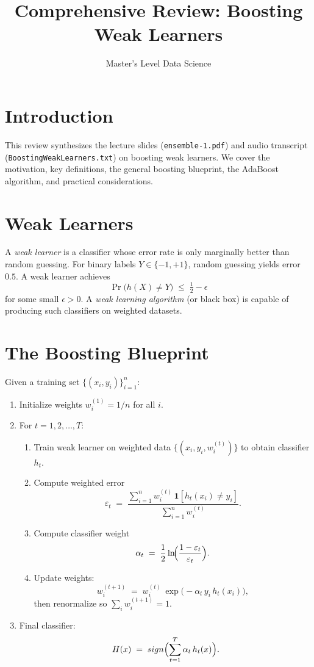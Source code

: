 \documentclass[11pt]{article}
\title{Comprehensive Review: Boosting Weak Learners}
\author{Master's Level Data Science}
\date{}
\begin{document}
\maketitle
\tableofcontents
\bigskip

\section{Introduction}
This review synthesizes the lecture slides (\texttt{ensemble-1.pdf}) and audio transcript (\texttt{BoostingWeakLearners.txt}) on boosting weak learners. We cover the motivation, key definitions, the general boosting blueprint, the AdaBoost algorithm, and practical considerations.

\section{Weak Learners}
A \emph{weak learner} is a classifier whose error rate is only marginally better than random guessing. For binary labels $Y\in\{-1,+1\}$, random guessing yields error $0.5$. A weak learner achieves
\[
  \Pr\bigl(h(X)\neq Y\bigr)\;\le\;\tfrac12 - \epsilon
\]
for some small $\epsilon>0$. A \emph{weak learning algorithm} (or black box) is capable of producing such classifiers on weighted datasets.

\section{The Boosting Blueprint}
Given a training set $\{(x_i,y_i)\}_{i=1}^n$:
\begin{enumerate}
  \item Initialize weights $w_i^{(1)} = 1/n$ for all $i$.
  \item For $t=1,2,\dots,T$:
    \begin{enumerate}
      \item Train weak learner on weighted data $\{(x_i,y_i,w_i^{(t)})\}$ to obtain classifier $h_t$.
      \item Compute weighted error
      \[
        \varepsilon_t \;=\; \frac{\sum_{i=1}^n w_i^{(t)}\,\mathbf{1}[h_t(x_i)\neq y_i]}
        {\sum_{i=1}^n w_i^{(t)}}.
      \]
      \item Compute classifier weight
      \[
        \alpha_t \;=\; \frac12 \ln\!\Bigl(\frac{1-\varepsilon_t}{\varepsilon_t}\Bigr).
      \]
      \item Update weights:
      \[
        w_i^{(t+1)} \;=\; w_i^{(t)} \,\exp\bigl(-\alpha_t\,y_i\,h_t(x_i)\bigr),
      \]
      then renormalize so $\sum_i w_i^{(t+1)}=1$.
    \end{enumerate}
  \item Final classifier:
  \[
    H(x) \;=\; sign\Bigl(\sum_{t=1}^T \alpha_t\,h_t(x)\Bigr).
  \]
\end{enumerate}
\end{document}

